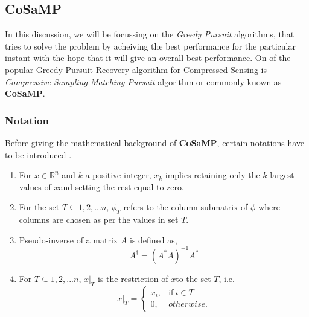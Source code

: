 \documentclass[12pt]{article}
\theoremstyle{definition}
\def\x{$x$\hspace{0.1in}}
\def\cosamp{\textbf{CoSaMP}\hspace{0.1in}}
\begin{document}
\subsection{CoSaMP}
In this discussion, we will be focussing on the \textit{Greedy Pursuit} algorithms, that tries to solve the problem
by acheiving the best performance for the particular instant with the hope that it will give an overall best performance.
On of the popular Greedy Pursuit Recovery algorithm for Compressed Sensing is \textit{Compressive Sampling
Matching Pursuit} algorithm or commonly known as \cosamp.

\subsubsection{Notation}
Before giving the mathematical background of \cosamp, certain notations have to be introduced \cite{Needell-CoSaMP}.
\begin{enumerate}
  \item For $x \in \mathbb{R}^n$ and $k$ a positive integer, $x_k$ implies retaining only the $k$ largest
values of \x and setting the rest equal to zero.
  
  \item For the set $T \subseteq {1,2,...n}$, $\phi_T$ refers to the column submatrix of $\phi$ where columns
  are chosen as per the values in set $T$.
  
  \item Pseudo-inverse of a matrix $A$ is defined as, 
  \begin{equation}
   A^\dagger= (A^\ast A)^{-1} A^\ast
  \end{equation}

  \item For $T \subseteq {1,2,...n}$, $x|_T$ is the restriction of \x to the set $T$, i.e. 
  \begin{equation}
   x|_T = 
   \begin{cases}
    x_i, & \text{if} \ i \in T\\
    0, & otherwise.
   \end{cases}
  \end{equation}

\end{enumerate}
\end{document}

